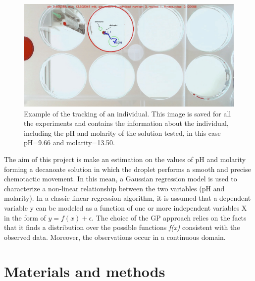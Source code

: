 \documentclass[a4paper]{article}
\begin{document}
\begin{figure}
	\centering
	\includegraphics[width=1\textwidth]{droplet_screen.jpg}
	\caption{Example of the tracking of an individual. This image is saved for all the experiments and contains the information about the individual, including the pH and molarity of the solution tested, in this case pH=9.66 and molarity=13.50.}
	\label{fig:droplet_screen}
\end{figure}

The aim of this project is make an estimation on the values of pH and molarity forming a decanoate solution in which the droplet performs a smooth and precise chemotactic movement. In this mean, a Gaussian regression model is used to characterize a non-linear relationship between the two variables (pH and molarity).
In a classic linear regression algorithm, it is assumed that a dependent variable y can be modeled as a function of one or more independent variables X in the form of $y=f(x)+\epsilon$.
The choice of the GP approach relies on the facts that it finds a distribution over the possible functions \textit{f(x)} consistent with the observed data. Moreover, the observations occur in a continuous domain. 
\newpage
\section{Materials and methods}
\end{document}
